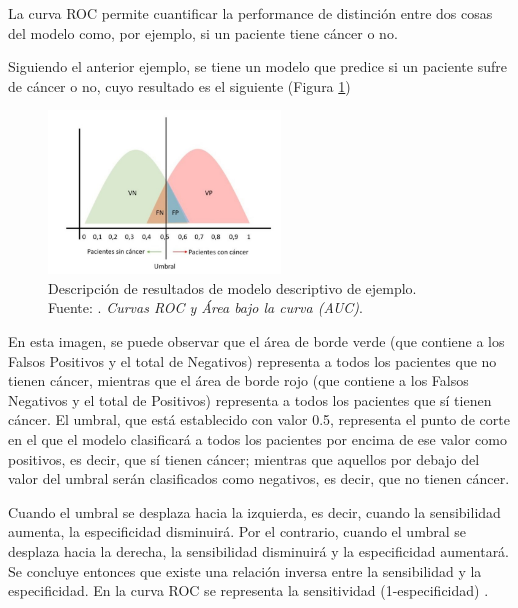 \begin{itemize}
	La curva ROC permite cuantificar la performance de distinción entre dos cosas del modelo como, por ejemplo, si un paciente tiene cáncer o no.
	
	Siguiendo el anterior ejemplo, se tiene un modelo que predice si un paciente sufre de cáncer o no, cuyo resultado es el siguiente (Figura \ref{3:fig11})
	
	\begin{figure}[htbp]
		\begin{center}
			\includegraphics[width=0.55\textwidth]{3/figures/auc_example.jpg}
			\caption[Descripción de resultados de modelo descriptivo de ejemplo]{Descripción de resultados de modelo descriptivo de ejemplo.\\
				Fuente: \cite{gl_gonzalez2019auc}. \textit{Curvas ROC y Área bajo la curva (AUC)}.}
			\label{3:fig11}
		\end{center}
	\end{figure}
	
	En esta imagen, se puede observar que el área de borde verde (que contiene a los Falsos Positivos y el total de Negativos) representa a todos los pacientes que no tienen cáncer, mientras que el área de borde rojo (que contiene a los Falsos Negativos y el total de Positivos) representa a todos los pacientes que sí tienen cáncer. El umbral, que está establecido con valor 0.5, representa el punto de corte en el que el modelo clasificará a todos los pacientes por encima de ese valor como positivos, es decir, que sí tienen cáncer; mientras que aquellos por debajo del valor del umbral serán clasificados como negativos, es decir, que no tienen cáncer.
	
	Cuando el umbral se desplaza hacia la izquierda, es decir, cuando la sensibilidad aumenta, la especificidad disminuirá. Por el contrario, cuando el umbral se desplaza hacia la derecha, la sensibilidad disminuirá y la especificidad aumentará. Se concluye entonces que existe una relación inversa entre la sensibilidad y la especificidad. En la curva ROC se representa la sensitividad (1-especificidad) \parencite{gl_gonzalez2019auc}.
	

\end{itemize}
